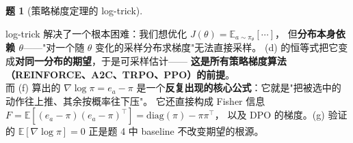 \documentclass[11pt,a4paper]{article}
\theoremstyle{definition}
\newtheorem{problem}{题}
\begin{document}
\begin{problem}[策略梯度定理的 log-trick]
\begin{topicbox}
\end{topicbox}
\begin{takeaway}
log-trick 解决了一个根本困难：我们想优化 $J(\theta) = \mathbb{E}_{a \sim \pi_\theta}[\cdots]$，
但\textbf{分布本身依赖 $\theta$}——"对一个随 $\theta$ 变化的采样分布求梯度"无法直接采样。
(d) 的恒等式把它变成\textbf{对同一分布的期望}，于是可采样估计——
\textbf{这是所有策略梯度算法（REINFORCE、A2C、TRPO、PPO）的前提}。\\
而 (f) 算出的 $\nabla\log\pi = e_a - \pi$ 是一个\textbf{反复出现的核心公式}：它就是"把被选中的动作往上推、其余按概率往下压"。
它还直接构成 Fisher 信息 $F = \mathbb{E}[(e_a-\pi)(e_a-\pi)^\top] = \mathrm{diag}(\pi) - \pi\pi^\top$，
以及 DPO 的梯度。(g) 验证的 $\mathbb{E}[\nabla\log\pi] = 0$ 正是题 4 中 baseline 不改变期望的根源。
\end{takeaway}
\end{problem}

\medskip
\end{document}
